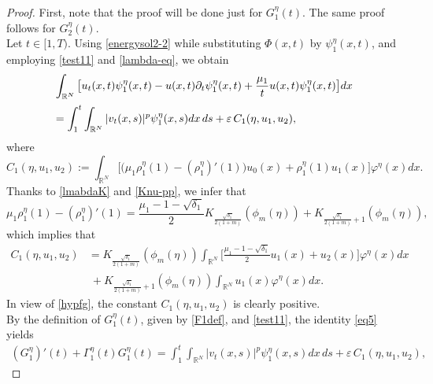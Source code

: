 \documentclass[12pt,leqno]{amsart}
\numberwithin{equation}{section}
\theoremstyle{remark}
\newcommand{\de}{\delta}
\def\R{{\mathbb{R}}}
\def\d{\displaystyle}
\def\e{{\varepsilon}}
\begin{document}
\begin{proof} 
First, note that the proof will be done just for $G^{\eta}_1(t)$. The same proof follows for $G^{\eta}_2(t)$.\\
Let $t \in [1,T)$. Using \eqref{energysol2-2} while substituting $\Phi(x, t)$ by $\psi^{\eta}_1(x, t)$, and employing \eqref{test11} and \eqref{lambda-eq}, we obtain
\begin{equation}
\begin{array}{l}\label{eq5}
\d \int_{\R^N}\big[u_t(x,t)\psi^{\eta}_1(x,t)- u(x,t)\partial_t \psi^{\eta}_1(x,t)+\frac{\mu_1}{t}u(x,t) \psi^{\eta}_1(x,t)\big]dx
\vspace{.2cm}\\
\d=\int_1^t\int_{\R^N}|v_t(x,s)|^p\psi^{\eta}_1(x,s)dx \, ds 
+\d \e \, C_1(\eta, u_1,u_2),
\end{array}
\end{equation}
where 
\begin{equation}\label{Cfg}
C_1(\eta, u_1,u_2):=\int_{\R^N}\big[\big(\mu_1\rho^{\eta}_1(1)-(\rho^{\eta}_1)'(1)\big)u_0(x)+\rho^{\eta}_1(1)u_1(x)\big] \varphi^{\eta}(x)dx.
\end{equation}
Thanks to \eqref{lmabdaK} and \eqref{Knu-pp}, we infer that
\begin{equation}\label{Cfg1}
\mu_1\rho^{\eta}_1(1)-(\rho^{\eta}_1)'(1)=\frac{\mu_1-1-\sqrt{\de_1}}{2}K_{\frac{\sqrt{\de_1}}{2(1+m)}}(\phi_{m}(\eta))+K_{\frac{\sqrt{\de_1}}{2(1+m)} +1}(\phi_{m}(\eta)),
\end{equation}
which implies that 
\begin{align}\label{Cfg}
C_1(\eta, u_1,u_2)&=K_{\frac{\sqrt{\de_1}}{2(1+m)}}(\phi_{m}(\eta)) \int_{\R^N} \big[\frac{\mu_1-1-\sqrt{\de_1}}2u_1(x)+u_2(x)\big]\varphi^{\eta}(x)dx \\&\ +K_{\frac{\sqrt{\de_1}}{2(1+m)} +1}(\phi_{m}(\eta))\int_{\R^N}u_1(x)\varphi^{\eta}(x)dx. \nonumber
\end{align}
In view of \eqref{hypfg},  the constant $C_1(\eta, u_1,u_2)$ is clearly positive.\\
By the definition of $G^{\eta}_1(t)$, given by \eqref{F1def},  and \eqref{test11}, the identity \eqref{eq5} yields
\begin{equation}
\begin{array}{l}\label{eq6}
\d \left(G_1^{\eta}\right)'(t)+\Gamma_1^{\eta}(t)G^{\eta}_1(t)=\int_1^t\int_{\R^N}|v_t(x,s)|^p\psi^{\eta}_1(x,s)dx \, ds +\e \, C_1(\eta, u_1,u_2),

\end{array}
\end{equation}
\end{proof}
\end{document}
